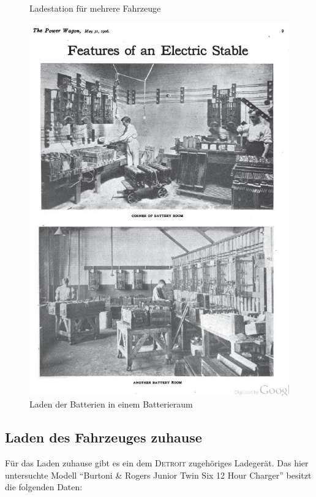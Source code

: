 \begin{landscape}
\begin{figure}
\begin{minipage}{0.65\textwidth}
	\caption{Ladestation für mehrere Fahrzeuge \cite{laden_alt}}
	\label{fig:Laden_Garage}
\end{minipage}
\begin{minipage}{0.65\textwidth}
	\includegraphics[width=\textwidth]{images/Laden_Batterieraum.jpg}
	\caption{Laden der Batterien in einem Batterieraum \cite{laden_alt}}
	\label{fig:Laden_Batterieraum}
\end{minipage}
\end{figure}
\end{landscape}

\subsection{Laden des Fahrzeuges zuhause}
Für das Laden zuhause gibt es ein dem \textsc{Detroit} zugehöriges Ladegerät. Das hier untersuchte Modell "`Burtoni \& Rogers Junior Twin Six 12 Hour Charger"' besitzt die folgenden Daten:

